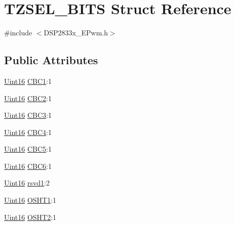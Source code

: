 \hypertarget{struct_t_z_s_e_l___b_i_t_s}{}\section{T\+Z\+S\+E\+L\+\_\+\+B\+I\+T\+S Struct Reference}
\label{struct_t_z_s_e_l___b_i_t_s}


{\ttfamily \#include $<$D\+S\+P2833x\+\_\+\+E\+Pwm.\+h$>$}

\subsection*{Public Attributes}
\begin{DoxyCompactItemize}
\item 
\hyperlink{_d_s_p2833x___device_8h_a59a9f6be4562c327cbfb4f7e8e18f08b}{Uint16} \hyperlink{struct_t_z_s_e_l___b_i_t_s_a15cc1188e9b27d116d93dc713d6a6f83}{C\+B\+C1}\+:1
\item 
\hyperlink{_d_s_p2833x___device_8h_a59a9f6be4562c327cbfb4f7e8e18f08b}{Uint16} \hyperlink{struct_t_z_s_e_l___b_i_t_s_ae891eff0d90dce2041ea2c516cccf710}{C\+B\+C2}\+:1
\item 
\hyperlink{_d_s_p2833x___device_8h_a59a9f6be4562c327cbfb4f7e8e18f08b}{Uint16} \hyperlink{struct_t_z_s_e_l___b_i_t_s_a40f244deef0c4f5e38f8f2395526b254}{C\+B\+C3}\+:1
\item 
\hyperlink{_d_s_p2833x___device_8h_a59a9f6be4562c327cbfb4f7e8e18f08b}{Uint16} \hyperlink{struct_t_z_s_e_l___b_i_t_s_a0da88d58314647f2c183713baaed1397}{C\+B\+C4}\+:1
\item 
\hyperlink{_d_s_p2833x___device_8h_a59a9f6be4562c327cbfb4f7e8e18f08b}{Uint16} \hyperlink{struct_t_z_s_e_l___b_i_t_s_a8c78381a9d915c79586fcd900ef3bbc3}{C\+B\+C5}\+:1
\item 
\hyperlink{_d_s_p2833x___device_8h_a59a9f6be4562c327cbfb4f7e8e18f08b}{Uint16} \hyperlink{struct_t_z_s_e_l___b_i_t_s_aa9f3ba2f2016ec3472e6455d0de844cb}{C\+B\+C6}\+:1
\item 
\hyperlink{_d_s_p2833x___device_8h_a59a9f6be4562c327cbfb4f7e8e18f08b}{Uint16} \hyperlink{struct_t_z_s_e_l___b_i_t_s_a304f548f3ec68f52f7bdd63fdc85fed2}{rsvd1}\+:2
\item 
\hyperlink{_d_s_p2833x___device_8h_a59a9f6be4562c327cbfb4f7e8e18f08b}{Uint16} \hyperlink{struct_t_z_s_e_l___b_i_t_s_adc7cc5cfa48cebe7eef8771e81f3c80c}{O\+S\+H\+T1}\+:1
\item 
\hyperlink{_d_s_p2833x___device_8h_a59a9f6be4562c327cbfb4f7e8e18f08b}{Uint16} \hyperlink{struct_t_z_s_e_l___b_i_t_s_ac4ccbe50e855606f4da80e249a98af2c}{O\+S\+H\+T2}\+:1

\end{DoxyCompactItemize}

